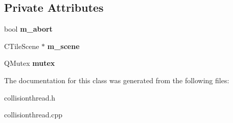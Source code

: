 \subsection*{Private Attributes}
\begin{DoxyCompactItemize}
\item 
\mbox{\label{class_collision_thread_adcc2b3ae707e6fd1ab884522cd69e8bf}} 
bool {\bfseries m\+\_\+abort}
\item 
\mbox{\label{class_collision_thread_a63f8735e54b0f4a2dfaf8be1c75e4a9e}} 
C\+Tile\+Scene $\ast$ {\bfseries m\+\_\+scene}
\item 
\mbox{\label{class_collision_thread_ac00c1e2465a80a6fb72e4f79dcff7f7d}} 
Q\+Mutex {\bfseries mutex}
\end{DoxyCompactItemize}


The documentation for this class was generated from the following files\+:\begin{DoxyCompactItemize}
\item 
collisionthread.\+h\item 
collisionthread.\+cpp\end{DoxyCompactItemize}
